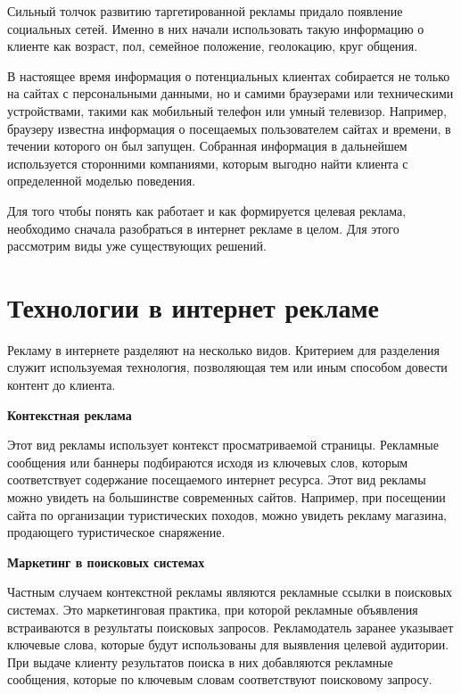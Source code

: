 Сильный толчок развитию таргетированной рекламы придало появление социальных сетей. Именно в них начали использовать такую информацию о клиенте как возраст, пол, семейное положение, геолокацию, круг общения. 

В настоящее время информация о потенциальных клиентах собирается не только на сайтах с персональными данными, но и самими браузерами или техническими устройствами, такими как мобильный телефон или умный телевизор. Например, браузеру известна информация о посещаемых пользователем сайтах и времени, в течении которого он был запущен. Собранная информация в дальнейшем используется сторонними компаниями, которым выгодно найти клиента с определенной моделью поведения. 

Для того чтобы понять как работает и как формируется целевая реклама, необходимо сначала разобраться в интернет рекламе в целом. Для этого рассмотрим виды уже существующих решений.

\section{Технологии в интернет рекламе}

Рекламу в интернете разделяют на несколько видов. Критерием для разделения служит используемая технология, позволяющая тем или иным способом довести контент до клиента.

\textbf{Контекстная реклама}

Этот вид рекламы использует контекст просматриваемой страницы. Рекламные сообщения или баннеры подбираются исходя из ключевых слов, которым соответствует содержание посещаемого интернет ресурса. Этот вид рекламы можно увидеть на большинстве современных сайтов. Например, при посещении сайта по организации туристических походов, можно увидеть рекламу магазина, продающего туристическое снаряжение.
    
\textbf{Маркетинг в поисковых системах}

Частным случаем контекстной рекламы являются рекламные ссылки в поисковых системах. Это маркетинговая практика, при которой рекламные объявления встраиваются в результаты поисковых запросов. Рекламодатель заранее указывает ключевые слова, которые будут использованы для выявления целевой аудитории. При выдаче клиенту результатов поиска в них добавляются рекламные сообщения, которые по ключевым словам соответствуют поисковому запросу.

